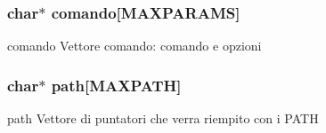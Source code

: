 \subsubsection[{comando}]{\setlength{\rightskip}{0pt plus 5cm}char$\ast$ comando[{\bf M\+A\+X\+P\+A\+R\+A\+MS}]}\label{mysh-0_82_8c_a0bfc8700e33b89f73487f8b2b5528576}


comando Vettore comando\+: comando e opzioni 

\subsubsection[{path}]{\setlength{\rightskip}{0pt plus 5cm}char$\ast$ path[{\bf M\+A\+X\+P\+A\+TH}]}\label{mysh-0_82_8c_ab93cef35fe712f550f47256583a74376}


path Vettore di puntatori che verra\textquotesingle{} riempito con i P\+A\+TH 

